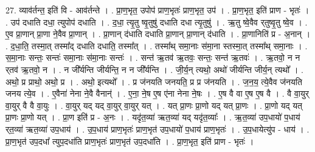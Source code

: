 \documentclass[17pt]{extarticle}
\begin{document}
27. व्याव॑र्तन्त॒ इति॑ वि - आव॑र्तन्ते । . प्रा॒ण॒भृत॒ उपोप॑ प्राण॒भृतः॑ प्राण॒भृत॒ उप॑ । . प्रा॒ण॒भृत॒ इति॑ प्राण - भृतः॑ । . उप॑ दधाति दधा॒ त्युपोप॑ दधाति । . द॒धा॒ त्यृ॒तु ष्वृ॒तुषु॑ दधाति दधा त्यृ॒तुषु॑ । . ऋ॒तु ष्वे॒वैव र्‌तुष्वृ॒तु ष्वे॒व । . ए॒व प्रा॒णान् प्रा॒णा ने॒वैव प्रा॒णान् । . प्रा॒णान् द॑धाति दधाति प्रा॒णान् प्रा॒णान् द॑धाति । . प्रा॒णानिति॑ प्र - अ॒नान् । . द॒धा॒ति॒ तस्मा॒त् तस्मा᳚द् दधाति दधाति॒ तस्मा᳚त् । . तस्मा᳚थ् समा॒नाः स॑मा॒ना स्तस्मा॒त् तस्मा᳚थ् समा॒नाः । . स॒मा॒नाः सन्तः॒ सन्तः॑ समा॒नाः स॑मा॒नाः सन्तः॑ । . सन्त॑ ऋ॒तव॑ ऋ॒तवः॒ सन्तः॒ सन्त॑ ऋ॒तवः॑ । . ऋ॒तवो॒ न न र्‌तव॑ ऋ॒तवो॒ न । . न जी᳚र्यन्ति जीर्यन्ति॒ न न जी᳚र्यन्ति । . जी॒र्य॒न् त्यथो॒ अथो॑ जीर्यन्ति जीर्य॒न् त्यथो᳚ । . अथो॒ प्र प्राथो॒ अथो॒ प्र । . अथो॒ इत्यथो᳚ । . प्र ज॑नयति जनयति॒ प्र प्र ज॑नयति । . ज॒न॒य॒ त्ये॒वैव ज॑नयति जनय त्ये॒व । . ए॒वैना॑ नेना ने॒वै वैनान्॑ । . ए॒ना॒ ने॒ष ए॒ष ए॑ना नेना ने॒षः । . ए॒ष वै वा ए॒ष ए॒ष वै । . वै वा॒युर् वा॒युर् वै वै वा॒युः । . वा॒युर् यद् यद् वा॒युर् वा॒युर् यत् । . यत् प्रा॒णः प्रा॒णो यद् यत् प्रा॒णः । . प्रा॒णो यद् यत् प्रा॒णः प्रा॒णो यत् । . प्रा॒ण इति॑ प्र - अ॒नः । . यदृ॑त॒व्या॑ ऋत॒व्या॑ यद् यदृ॑त॒व्याः᳚ । . ऋ॒त॒व्या॑ उप॒धायो॑ प॒धाय॑ र्‌त॒व्या॑ ऋत॒व्या॑ उप॒धाय॑ । . उ॒प॒धाय॑ प्राण॒भृतः॑ प्राण॒भृत॑ उप॒धायो॑ प॒धाय॑ प्राण॒भृतः॑ । . उ॒प॒धायेत्यु॑प - धाय॑ । . प्रा॒ण॒भृत॑ उप॒दधा᳚ त्युप॒दधा॑ति प्राण॒भृतः॑ प्राण॒भृत॑ उप॒दधा॑ति । . प्रा॒ण॒भृत॒ इति॑ प्राण - भृतः॑ । \newline
\end{document}
